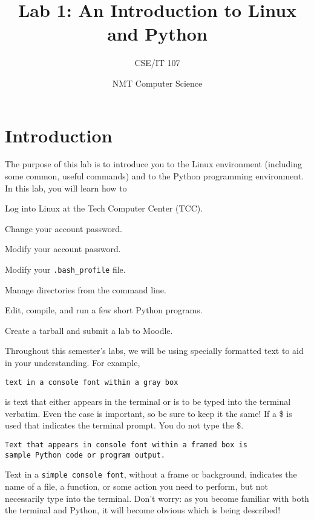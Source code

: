 \documentclass[12pt]{article}
\title{Lab 1: An Introduction to Linux and Python}
\author{CSE/IT 107}
\date{NMT Computer Science}
\begin{document}
\maketitle

\section{Introduction}

The purpose of this lab is to introduce you to the Linux environment (including some common, useful commands) and to the Python programming environment. In this lab, you will learn how to
\begin{enumerate*}
\item Log into Linux at the Tech Computer Center (TCC).
\item Change your account password.
\item Modify your account password.
\item Modify your \texttt{.bash\_profile} file.
\item Manage directories from the command line.
\item Edit, compile, and run a few short Python programs.
\item Create a tarball and submit a lab to Moodle.
\end{enumerate*}


Throughout this semester's labs, we will be using specially formatted text to aid in your understanding. For example,
\begin{lstlisting}[style=bash]
text in a console font within a gray box
\end{lstlisting}
is text that either appears in the terminal or is to be typed into the terminal verbatim. Even the case is important, so be sure to keep it the same! If a \$ is used that indicates the terminal prompt. You do not type the \$.

\vspace{12pt}

\begin{lstlisting}[style=c]
Text that appears in console font within a framed box is 
sample Python code or program output.
\end{lstlisting}

\vspace{12pt}

Text in a \texttt{simple console font}, without a frame or background, indicates the name of a file, a function, or some action you need to perform, but not necessarily type into the terminal. Don't worry: as you become familiar with both the terminal and Python, it will become obvious which is being described!
\end{document}
